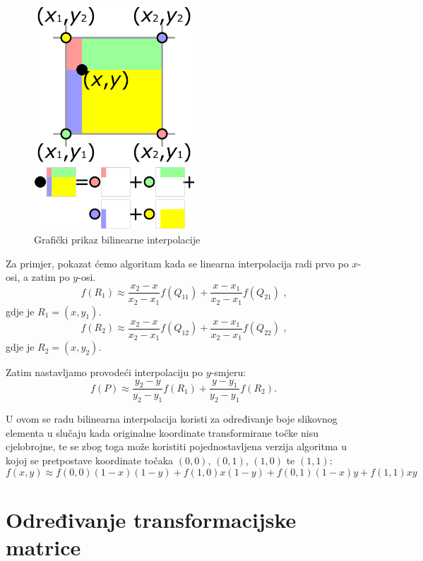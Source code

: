 \begin{figure}[ht]
\centering
\includegraphics[width=6cm]{figures/bilint_visualization.png}
\caption{Grafički prikaz bilinearne interpolacije}
\label{fig:bilintPrikaz}
\end{figure}

Za primjer, pokazat ćemo algoritam kada se linearna interpolacija radi prvo po $x$-osi, a zatim po $y$-osi.
\begin{equation}
f(R_1) \approx \frac{x_2 - x}{x_2 - x_1} f(Q_{11}) + \frac{x - x_1}{x_2 - x_1} f(Q_{21})\text{ ,}
\end{equation}
gdje je  $R_1 = (x, y_1)$.
\begin{equation}
f(R_2) \approx \frac{x_2 - x}{x_2 - x_1} f(Q_{12}) + \frac{x - x_1}{x_2 - x_1} f(Q_{22})\text{ ,}
\end{equation}
gdje je  $R_2 = (x, y_2)$.

Zatim nastavljamo provodeći interpolaciju po $y$-smjeru:
\begin{equation}
f(P) \approx \frac{y_2 - y}{y_2 - y_1} f(R_1) + \frac{y - y_1}{y_2 - y_1} f(R_2).
\end{equation}

U ovom se radu bilinearna interpolacija koristi za određivanje boje slikovnog elementa  u slučaju kada originalne koordinate transformirane točke nisu cjelobrojne, te se zbog toga može koristiti pojednostavljena verzija algoritma u kojoj se pretpostave koordinate točaka $(0,0)$, $(0, 1)$, $(1, 0)$ te $(1, 1)$:
\begin{equation}
f(x, y) \approx f(0, 0)(1 - x)(1 -  y) + f(1, 0) x (1 - y) + f(0, 1) (1 - x) y + f(1, 1) x y
\end{equation}

\section{Određivanje transformacijske matrice}
\label{sec:odredjivanjeTransMat}

